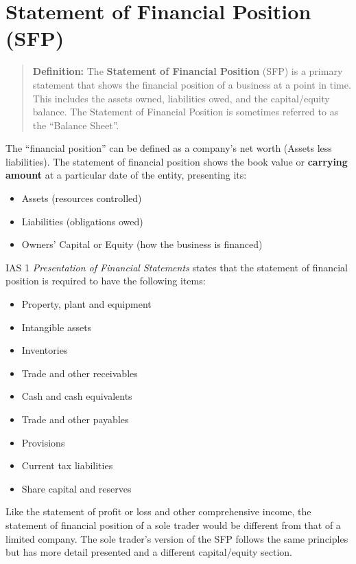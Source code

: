 \section{Statement of Financial Position (SFP)}

\begin{quote}
\textbf{Definition:} The \textbf{Statement of Financial Position} (SFP) is a primary statement that shows the financial position of a business at a point in time. This includes the assets owned, liabilities owed, and the capital/equity balance. The Statement of Financial Position is sometimes referred to as the ``Balance Sheet''.
\end{quote}

The ``financial position'' can be defined as a company's net worth (Assets less liabilities). The statement of financial position shows the book value or \textbf{carrying amount} at a particular date of the entity, presenting its:
\begin{itemize}
    \item Assets (resources controlled)
    \item Liabilities (obligations owed)
    \item Owners' Capital or Equity (how the business is financed)
\end{itemize}

IAS 1 \textit{Presentation of Financial Statements} states that the statement of financial position is required to have the following items:
\begin{itemize}
    \item Property, plant and equipment
    \item Intangible assets
    \item Inventories
    \item Trade and other receivables
    \item Cash and cash equivalents
    \item Trade and other payables
    \item Provisions
    \item Current tax liabilities
    \item Share capital and reserves
\end{itemize}

Like the statement of profit or loss and other comprehensive income, the statement of financial position of a sole trader would be different from that of a limited company. The sole trader's version of the SFP follows the same principles but has more detail presented and a different capital/equity section.

